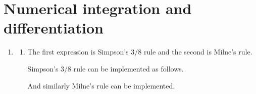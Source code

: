 \documentclass[a4paper,11pt]{article}
\begin{document}
\section{Numerical integration and differentiation}
\begin{enumerate}
	\item \begin{enumerate}
		\item The first expression is Simpson's 3/8 rule and the second is 
		Milne's rule.
		
		Simpson's 3/8 rule can be implemented as follows.
		
		And similarly Milne's rule can be implemented.
		
	\end{enumerate}
\end{enumerate}
\end{document}
